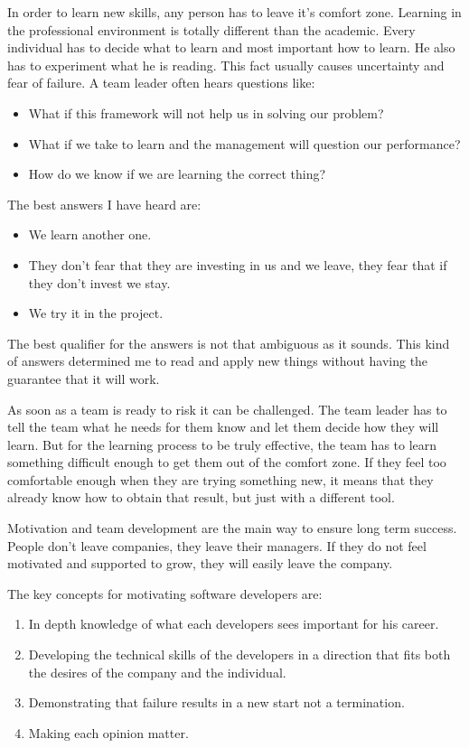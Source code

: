 In order to learn new skills, any person has to leave it's comfort zone. Learning in the professional environment is totally different than the academic. Every individual has to decide what to learn and most important how to learn. He also has to experiment what he is reading. This fact usually causes uncertainty and fear of failure. A team leader often hears questions like:

\begin{itemize}
\item What if this framework will not help us in solving our problem?
\item What if we take to learn and the management will question our performance?
\item How do we know if we are learning the correct thing?
\end{itemize}

The best answers I have heard are:
\begin{itemize}
\item We learn another one.
\item They don't fear that they are investing in us and we leave, they fear that if they don't invest we stay.
\item We try it in the project.
\end{itemize}

The best qualifier for the answers is not that ambiguous as it sounds. This kind of answers determined me to read and apply new things without having the guarantee that it will work. 

As soon as a team is ready to risk it can be challenged. The team leader has to tell the team what he needs for them know and let them decide how they will learn. But for the learning process to be truly effective, the team has to learn something difficult enough to get them out of the comfort zone. If they feel too comfortable enough when they are trying something new, it means that they already know how to obtain that result, but just with a different tool. 

Motivation and team development are the main way to ensure long term success. People don't leave companies, they leave their managers. If they do not feel motivated and supported to grow, they will easily leave the company.

The key concepts for motivating software developers are:
\begin{enumerate}
\item In depth knowledge of what each developers sees important for his career.
\item Developing the technical skills of the developers in a direction that fits both the desires of the company and the individual.
\item Demonstrating that failure results in a new start not a termination.
\item Making each opinion matter.
\end{enumerate}